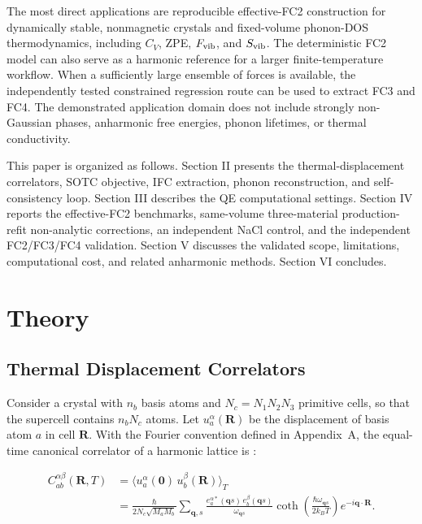 \documentclass[aps,prb,reprint,amsmath,amssymb,floatfix]{revtex4-2}
\begin{document}
The most direct applications are reproducible effective-FC2 construction for
dynamically stable, nonmagnetic crystals and fixed-volume phonon-DOS
thermodynamics, including \(C_V\), ZPE, \(F_{\rm vib}\), and
\(S_{\rm vib}\). The deterministic FC2 model can also serve as a harmonic
reference for a larger finite-temperature workflow. When a sufficiently large
ensemble of forces is available, the independently tested constrained
regression route can be used to extract FC3 and FC4. The demonstrated application domain does not
include strongly non-Gaussian phases, anharmonic free energies, phonon
lifetimes, or thermal conductivity.

This paper is organized as follows. Section II presents the thermal-displacement
correlators, SOTC objective, IFC extraction, phonon reconstruction, and
self-consistency loop. Section III describes the QE computational settings.
Section IV reports the effective-FC2 benchmarks, same-volume three-material
production-refit non-analytic corrections, an independent NaCl control,
and the independent FC2/FC3/FC4 validation. Section V discusses the validated
scope, limitations, computational cost, and related anharmonic methods.
Section VI concludes.

\section{Theory}\label{theory}

\subsection{Thermal Displacement
Correlators}\label{thermal-displacement-correlators}

Consider a crystal with \(n_b\) basis atoms and \(N_c=N_1N_2N_3\)
primitive cells, so that the supercell contains \(n_bN_c\) atoms. Let
\(u_a^\alpha(\mathbf R)\) be the displacement of basis atom \(a\) in cell
\(\mathbf R\). With the Fourier convention defined in Appendix~A, the
equal-time canonical correlator of a harmonic lattice is \cite{ref13}:

{\scriptsize
\begin{align}
C_{ab}^{\alpha\beta}(\mathbf{R},T)
  &= \langle u_a^\alpha(\mathbf{0})\, u_b^\beta(\mathbf{R})\rangle_T \nonumber \\
  &= \frac{\hbar}{2N_c\sqrt{M_a M_b}} \sum_{\mathbf{q},s}
     \frac{e_a^{\alpha*}(\mathbf{q}s)\,e_b^{\beta}(\mathbf{q}s)}{\omega_{\mathbf{q}s}}
     \coth\!\left(\frac{\hbar\omega_{\mathbf{q}s}}{2k_BT}\right)
     e^{-i\mathbf{q}\cdot\mathbf{R}} .
\end{align}
}
\end{document}
